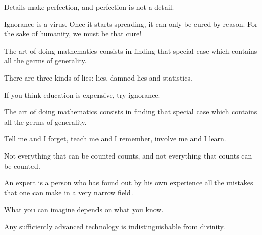 \documentclass[12pt,a4paper,twoside,openright]{report}
\theoremstyle{definition}
\theoremstyle{itexmp}
\numberwithin{equation}{section}
\begin{document}
 	\begin{fquote}Details make perfection, and perfection is not a detail.
 	\end{fquote}
 	
 	\begin{fquote}Ignorance is a virus. Once it starts spreading, it can only be cured by reason. For the sake of humanity, we must be that cure!
 	\end{fquote}
 	
 	\begin{fquote}The art of doing mathematics consists in finding that special case which contains all the germs of generality. 
 	\end{fquote}

 	\begin{fquote}There are three kinds of lies: lies, damned lies and statistics. 
 	\end{fquote}

 	\begin{fquote}If you think education is expensive, try ignorance.
 	\end{fquote}
 
  	\begin{fquote}The art of doing mathematics consists in finding that special case which contains all the germs of generality.
 	\end{fquote}
 	
 	 \begin{fquote}Tell me and I forget, teach me and I remember, involve me and I learn.
 	\end{fquote}
  	
 	 \begin{fquote}Not everything that can be counted counts, and not everything that counts can be counted.
 	\end{fquote}

 	 \begin{fquote}An expert is a person who has found out by his own experience all the mistakes that one can make in a very narrow field.
 	\end{fquote}
 	
 	 \begin{fquote}What you can imagine depends on what you know.
 	\end{fquote}
 	
 	\begin{fquote}Any sufficiently advanced technology is indistinguishable from divinity.
 	\end{fquote}
 	
\end{document}
